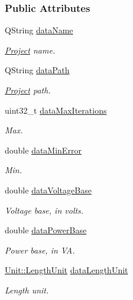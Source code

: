 \subsubsection*{Public Attributes}
\begin{DoxyCompactItemize}
\item 
Q\+String \hyperlink{class_new_project_ad0ebf4e6b19dbdf3a9ad4af27df2a8fa}{data\+Name}
\begin{DoxyCompactList}\small\item\em \hyperlink{class_project}{Project} name. \end{DoxyCompactList}\item 
Q\+String \hyperlink{class_new_project_ac684c762d3c15ff4463622978193e827}{data\+Path}
\begin{DoxyCompactList}\small\item\em \hyperlink{class_project}{Project} path. \end{DoxyCompactList}\item 
uint32\+\_\+t \hyperlink{class_new_project_a42e0ddd47dd58e3634ec274e7af00ba9}{data\+Max\+Iterations}
\begin{DoxyCompactList}\small\item\em Max. \end{DoxyCompactList}\item 
double \hyperlink{class_new_project_a186c2163239625faf8c7769a72fa988c}{data\+Min\+Error}
\begin{DoxyCompactList}\small\item\em Min. \end{DoxyCompactList}\item 
double \hyperlink{class_new_project_a21dc54f9c0c8a59ca33eaa42cb9f9352}{data\+Voltage\+Base}
\begin{DoxyCompactList}\small\item\em Voltage base, in volts. \end{DoxyCompactList}\item 
double \hyperlink{class_new_project_a7a70270ca856001875a6043d5aa7a8af}{data\+Power\+Base}
\begin{DoxyCompactList}\small\item\em Power base, in V\+A. \end{DoxyCompactList}\item 
\hyperlink{class_unit_a8c8921f7b225ad6063b1cb573425b9a0}{Unit\+::\+Length\+Unit} \hyperlink{class_new_project_ac0bf8b4f04f5c9425c74dd980711f021}{data\+Length\+Unit}
\begin{DoxyCompactList}\small\item\em Length unit. \end{DoxyCompactList}\item 

\end{DoxyCompactItemize}
